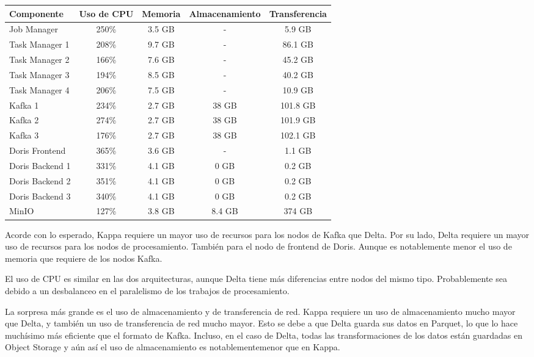 \begin{longtable}{|p{3cm}|c|c|c|c|}
    \hline
    \textbf{Componente} & \textbf{Uso de CPU} & \textbf{Memoria} & \textbf{Almacenamiento} & \textbf{Transferencia} \\
    \hline
    Job Manager & 250\% & 3.5 GB & - & 5.9 GB \\
    \hline
    Task Manager 1 & 208\% & 9.7 GB & - & 86.1 GB \\
    \hline
    Task Manager 2 & 166\% & 7.6 GB & - & 45.2 GB \\
    \hline
    Task Manager 3 & 194\% & 8.5 GB & - & 40.2 GB \\
    \hline
    Task Manager 4 & 206\% & 7.5 GB & - & 10.9 GB \\
    \hline
    Kafka 1 & 234\% & 2.7 GB & 38 GB & 101.8 GB \\
    \hline
    Kafka 2 & 274\% & 2.7 GB & 38 GB & 101.9 GB \\
    \hline
    Kafka 3 & 176\% & 2.7 GB & 38 GB & 102.1 GB \\
    \hline
    Doris Frontend & 365\% & 3.6 GB & - & 1.1 GB \\
    \hline
    Doris Backend 1 & 331\% & 4.1 GB & 0 GB & 0.2 GB \\
    \hline
    Doris Backend 2 & 351\% & 4.1 GB & 0 GB & 0.2 GB \\
    \hline
    Doris Backend 3 & 340\% & 4.1 GB & 0 GB & 0.2 GB \\
    \hline 
    MinIO & 127\% & 3.8 GB & 8.4 GB & 374 GB \\
    \hline
\end{longtable}

\newpage

Acorde con lo esperado, Kappa requiere un mayor uso de recursos para los nodos de Kafka que Delta.
Por su lado, Delta requiere un mayor uso de recursos para los nodos de procesamiento. También para el nodo de frontend de Doris. 
Aunque es notablemente menor el uso de memoria que requiere de los nodos Kafka.

El uso de CPU es similar en las dos arquitecturas, aunque Delta tiene más diferencias entre nodos del mismo tipo. 
Probablemente sea debido a un desbalanceo en el paralelismo de los trabajos de procesamiento. 

La sorpresa más grande es el uso de almacenamiento y de transferencia de red. 
Kappa requiere un uso de almacenamiento mucho mayor que Delta, y también un uso de transferencia de red mucho mayor.
Esto se debe a que Delta guarda sus datos en Parquet, lo que lo hace muchísimo más eficiente que el formato de Kafka.
Incluso, en el caso de Delta, todas las transformaciones de los datos están guardadas en Object Storage 
y aún así el uso de almacenamiento es notablementemenor que en Kappa. 

